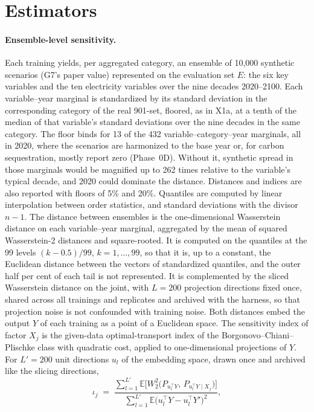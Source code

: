 \documentclass[11pt,a4paper]{article}
\begin{document}
\section{Estimators}\label{sec:estimators}
\paragraph{Ensemble-level sensitivity.} Each training yields, per
aggregated category, an ensemble of 10{,}000 synthetic scenarios (G7's
paper value) represented on the evaluation set $E$: the six key variables
and the ten electricity variables over the nine decades 2020--2100. Each
variable--year marginal is standardized by its standard deviation in
the corresponding category of the real 901-set, floored, as in X1a,
at a tenth of the median of that variable's standard deviations over the
nine decades in the same category. The floor binds for 13 of the 432
variable--category--year marginals, all in 2020, where the scenarios are
harmonized to the base year or, for carbon sequestration, mostly report
zero (Phase~0D). Without it, synthetic spread in those marginals would be
magnified up to 262 times relative to the variable's typical decade, and
2020 could dominate the distance. Distances and indices are also reported
with floors of 5\% and 20\%. Quantiles are computed by linear
interpolation between order statistics, and standard deviations with the
divisor $n-1$. The distance between ensembles is the one-dimensional
Wasserstein distance on each variable--year marginal, aggregated by the
mean of squared Wasserstein-2 distances and square-rooted. It is
computed on the quantiles at the 99 levels $(k-0.5)/99$, $k=1,\dots,99$,
so that it is, up to a constant, the Euclidean distance between the
vectors of standardized quantiles, and the outer half per cent of each
tail is not represented. It is complemented by the sliced Wasserstein
distance on the joint, with $L=200$ projection directions fixed once,
shared across all trainings and replicates and archived with the harness,
so that projection noise is not confounded with training noise.
Both distances embed the output $Y$ of each training as a point of a
Euclidean space. The sensitivity index of factor $X_j$ is the given-data
optimal-transport index of the Borgonovo--Chiani--Plischke class with
quadratic cost, applied to one-dimensional projections of $Y$. For
$L'=200$ unit directions $u_l$ of the embedding space, drawn once and
archived like the slicing directions,
\[
\iota_j \;=\; \frac{\sum_{l=1}^{L'}\mathbb{E}\big[W_2^2\big(P_{u_l^{\top}Y},\,P_{u_l^{\top}Y\mid X_j}\big)\big]}
{\sum_{l=1}^{L'}\mathbb{E}\big(u_l^{\top}Y-u_l^{\top}Y'\big)^2},
\]
\end{document}
